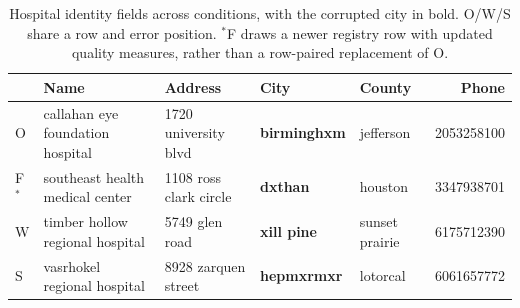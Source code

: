 \begin{table}[t]
  \caption{Hospital identity fields across conditions, with the corrupted city in bold.
  O/W/S share a row and error position. $^*$F draws a newer registry row with updated quality
  measures, rather than a row-paired replacement of O.}
  \label{tab:example}
  \small
  \begin{tabular*}{\textwidth}{@{\extracolsep{\fill}}lllllr@{}}
    \toprule
    & Name & Address & City & County & Phone \\
    \midrule
    O & callahan eye foundation hospital & 1720 university blvd & \textbf{birminghxm} & jefferson & 2053258100 \\
    F$^*$ & southeast health medical center & 1108 ross clark circle & \textbf{dxthan} & houston & 3347938701 \\
    W & timber hollow regional hospital & 5749 glen road & \textbf{xill pine} & sunset prairie & 6175712390 \\
    S & vasrhokel regional hospital & 8928 zarquen street & \textbf{hepmxrmxr} & lotorcal & 6061657772 \\
    \bottomrule
  \end{tabular*}
\end{table}
